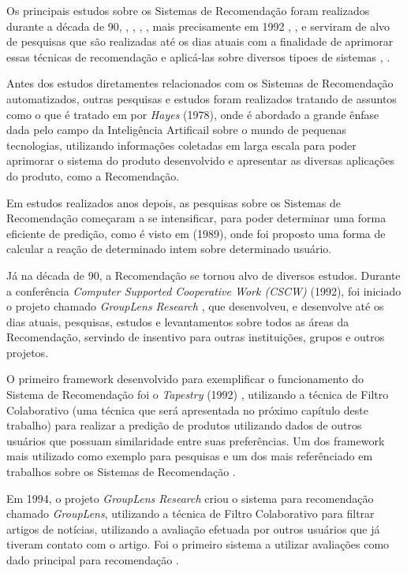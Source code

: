 \documentclass[12pt,
				openright,
				twoside,
				a4paper,
				apter=TITLE,
				section=TITLE,
				subsection=TITLE,
				chapter=TITLE,
				english,
				brazil]{abntex2}
\begin{document}
Os principais estudos sobre os Sistemas de Recomendação foram realizados durante a década de 90, \cite{adomavicius2005toward}, \cite{ricci2011introduction}, \cite{adomavicius2005incorporating}, \cite{schafer1999recommender}, mais precisamente em 1992 \cite{goldberg1992using}, \cite{konstan1998recommender}, e serviram de alvo de pesquisas que são realizadas até os dias atuais com a finalidade de aprimorar essas técnicas de recomendação e aplicá-las sobre diversos tipoes de sistemas \cite{bennett2007netflix}, \cite{linden2003amazon}.

Antes dos estudos diretamentes relacionados com os Sistemas de Recomendação automatizados, outras pesquisas e estudos foram realizados tratando de assuntos como o que é tratado em \cite{hayes1978naive} por \textit{Hayes} (1978), onde é abordado a grande ênfase dada pelo campo da Inteligência Artificail sobre o mundo de pequenas tecnologias, utilizando informações coletadas em larga escala para poder aprimorar o sistema do produto desenvolvido e apresentar as diversas aplicações do produto, como a Recomendação.

Em estudos realizados anos depois, as pesquisas sobre os Sistemas de Recomendação começaram a se intensificar, para poder determinar uma forma eficiente de predição, como é visto em \cite{hey1989system} (1989), onde foi proposto uma forma de calcular a reação de determinado intem sobre determinado usuário.

Já na década de 90, a Recomendação se tornou alvo de diversos estudos. Durante a conferência \textit{Computer Supported Cooperative Work (CSCW)} (1992), foi iniciado o projeto chamado \textit{GroupLens Research} \cite{konstan1998recommender}, que desenvolveu, e desenvolve até os dias atuais, pesquisas, estudos e levantamentos sobre todos as áreas da Recomendação, servindo de insentivo para outras instituições, grupos e outros projetos.

O primeiro framework desenvolvido para exemplificar o funcionamento do Sistema de Recomendação foi o \textit{Tapestry} (1992) \cite{goldberg1992using}, utilizando a técnica de Filtro Colaborativo (uma técnica que será apresentada no próximo capítulo deste trabalho) para realizar a predição de produtos utilizando dados de outros usuários que possuam similaridade entre suas preferências. Um dos framework mais utilizado como exemplo para pesquisas e um dos mais referênciado em trabalhos sobre os Sistemas de Recomendação \cite{vozalis2003recommender}.

Em 1994, o projeto \textit{GroupLens Research} criou o sistema para recomendação chamado \textit{GroupLens}, utilizando a técnica de Filtro Colaborativo para filtrar artigos de notícias, utilizando a avaliação efetuada por outros usuários que já tiveram contato com o artigo. Foi o primeiro sistema a utilizar avaliações como dado principal para recomendação \cite{resnick1994grouplens}. 
\end{document}
